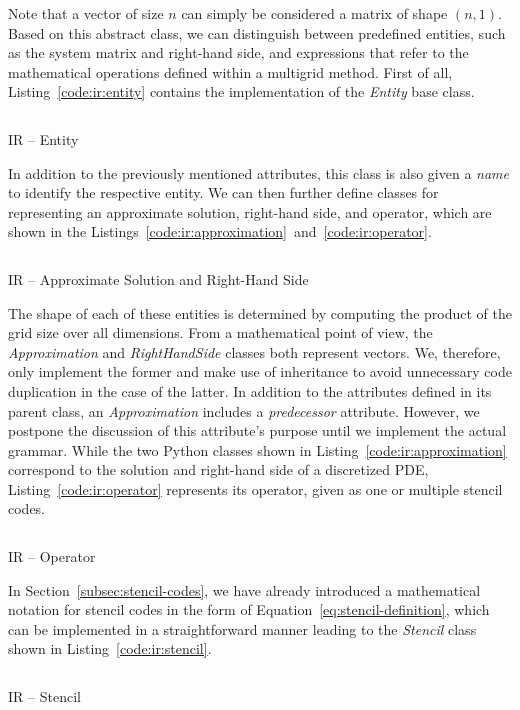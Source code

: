 Note that a vector of size $n$ can simply be considered a matrix of shape $(n,1)$.
Based on this abstract class, we can distinguish between predefined entities, such as the system matrix and right-hand side, and expressions that refer to the mathematical operations defined within a multigrid method.
First of all, Listing~\ref{code:ir:entity} contains the implementation of the \emph{Entity} base class.
\begin{listing}
	\inputminted{python}{evostencils/ir/entity.py}
	\caption{IR -- Entity}
	\label{code:ir:entity}
\end{listing}
In addition to the previously mentioned attributes, this class is also given a \emph{name} to identify the respective entity.
We can then further define classes for representing an approximate solution, right-hand side, and operator, which are shown in the Listings~\ref{code:ir:approximation}~and~\ref{code:ir:operator}.
\begin{listing}
	\inputminted{python}{evostencils/ir/approximation.py}
	\caption{IR -- Approximate Solution and Right-Hand Side}
	\label{code:ir:approximation}
\end{listing}
The shape of each of these entities is determined by computing the product of the grid size over all dimensions.
From a mathematical point of view, the \emph{Approximation} and \emph{RightHandSide} classes both represent vectors.
We, therefore, only implement the former and make use of inheritance to avoid unnecessary code duplication in the case of the latter.
In addition to the attributes defined in its parent class, an \emph{Approximation} includes a \emph{predecessor} attribute.
However, we postpone the discussion of this attribute's purpose until we implement the actual grammar.
While the two Python classes shown in Listing~\ref{code:ir:approximation} correspond to the solution and right-hand side of a discretized PDE, Listing~\ref{code:ir:operator} represents its operator, given as one or multiple stencil codes.
\begin{listing}
	\inputminted{python}{evostencils/ir/operator.py}
	\caption{IR -- Operator}
	\label{code:ir:operator}
\end{listing}
In Section~\ref{subsec:stencil-codes}, we have already introduced a mathematical notation for stencil codes in the form of Equation~\eqref{eq:stencil-definition}, which can be implemented in a straightforward manner leading to the \emph{Stencil} class shown in Listing~\ref{code:ir:stencil}.
\begin{listing}
	\inputminted{python}{evostencils/ir/stencil.py}
	\caption{IR -- Stencil}
	\label{code:ir:stencil}
\end{listing}
